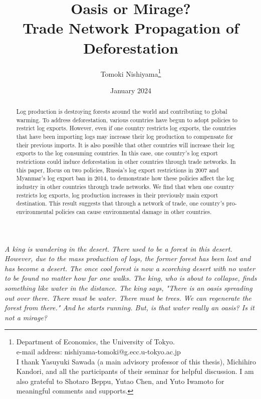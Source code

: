 \documentclass[a4paper,12pt]{article}
\begin{document}
\title{Oasis or Mirage? \\ Trade Network Propagation of Deforestation}
\author{Tomoki Nishiyama\footnote{Department of Economics, the University of Tokyo. \\ e-mail address: nishiyama-tomoki@g.ecc.u-tokyo.ac.jp \\ I thank Yasuyuki Sawada (a main advisory professor of this thesis), Michihiro Kandori, and all the participants of their seminar for helpful discussion. I am also grateful to Shotaro Beppu, Yutao Chen, and Yuto Iwamoto for meaningful comments and supports.}}
\date{January 2024}
\maketitle

\begin{abstract}
    Log production is destroying forests around the world and contributing to global warming. To address deforestation, various countries have begun to adopt policies to restrict log exports. However, even if one country restricts log exports, the countries that have been importing logs may increase their log production to compensate for their previous imports. It is also possible that other countries will increase their log exports to the log consuming countries. In this case, one country's log export restrictions could induce deforestation in other countries through trade networks. In this paper, Ifocus on two policies, Russia's log export restrictions in 2007 and Myanmar's log export ban in 2014, to demonstrate how these policies affect the log industry in other countries through trade networks. We find that when one country restricts log exports, log production increases in their previously main export destination. This result suggests that through a network of trade, one country's pro-environmental policies can cause environmental damage in other countries.
\end{abstract}

\textit{
    A king is wandering in the desert. There used to be a forest in this desert. However, due to the mass production of logs, the former forest has been lost and has become a desert. The once cool forest is now a scorching desert with no water to be found no matter how far one walks. The king, who is about to collapse, finds something like water in the distance. The king says, "There is an oasis spreading out over there. There must be water. There must be trees. We can regenerate the forest from there." And he starts running. But, is that water really an oasis? Is it not a mirage?
}
\end{document}
